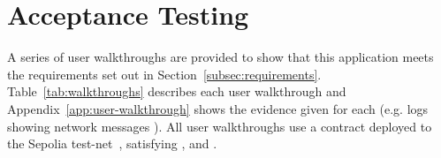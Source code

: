 
\section{Acceptance Testing}\label{sec:acc-tests}

A series of user walkthroughs are provided to show that this application meets the requirements set out in Section~\ref{subsec:requirements}. Table~\ref{tab:walkthroughs} describes each user walkthrough and Appendix~\ref{app:user-walkthrough} shows the evidence given for each (e.g. logs showing network messages ). All user walkthroughs use a contract deployed to the Sepolia test-net~\cite{etherscanio_deployed_nodate}, satisfying ,  and .

\newcommand{\p}[1]{$P_{#1}$}
\newcommand{\g}[1]{$G_{#1}$}

